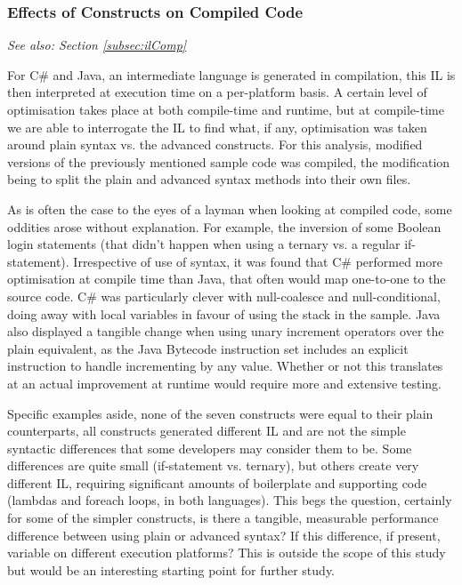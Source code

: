 \documentclass{article}
\begin{document}
        \subsubsection{Effects of Constructs on Compiled Code}
            \textit{See also: Section \ref{subsec:ilComp}}
            \newline

            \noindent For C\# and Java, an intermediate language is generated in compilation, this IL is then interpreted at execution time on a per-platform basis. A certain level of optimisation takes place at both compile-time and runtime, but at compile-time we are able to interrogate the IL to find what, if any, optimisation was taken around plain syntax vs. the advanced constructs. For this analysis, modified versions of the previously mentioned sample code was compiled, the modification being to split the plain and advanced syntax methods into their own files.

            As is often the case to the eyes of a layman when looking at compiled code, some oddities arose without explanation. For example, the inversion of some Boolean login statements (that didn't happen when using a ternary vs. a regular if-statement). Irrespective of use of syntax, it was found that C\# performed more optimisation at compile time than Java, that often would map one-to-one to the source code. C\# was particularly clever with null-coalesce and null-conditional, doing away with local variables in favour of using the stack in the sample. Java also displayed a tangible change when using unary increment operators over the plain equivalent, as the Java Bytecode instruction set includes an explicit instruction to handle incrementing by any value. Whether or not this translates at an actual improvement at runtime would require more and extensive testing.

            Specific examples aside, none of the seven constructs were equal to their plain counterparts, all constructs generated different IL and are not the simple syntactic differences that some developers may consider them to be. Some differences are quite small (if-statement vs. ternary), but others create very different IL, requiring significant amounts of boilerplate and supporting code (lambdas and foreach loops, in both languages). This begs the question, certainly for some of the simpler constructs, is there a tangible, measurable performance difference between using plain or advanced syntax? If this difference, if present, variable on different execution platforms? This is outside the scope of this study but would be an interesting starting point for further study.
\end{document}
